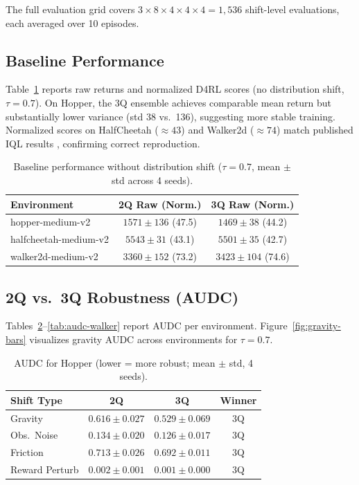 \documentclass[conference]{IEEEtran}
\begin{document}
The full evaluation grid covers $3 \times 8 \times 4 \times 4 \times 4 =
1{,}536$ shift-level evaluations, each averaged over 10 episodes.

\subsection{Baseline Performance}

Table~\ref{tab:baseline} reports raw returns and normalized D4RL scores (no
distribution shift, $\tau = 0.7$). On Hopper, the 3Q ensemble achieves
comparable mean return but substantially lower variance (std 38 vs.\ 136),
suggesting more stable training. Normalized scores on HalfCheetah
(${\approx}43$) and Walker2d (${\approx}74$) match published IQL results
\cite{kostrikov2022iql}, confirming correct reproduction.

\begin{table}[t]
  \centering
  \caption{Baseline performance without distribution shift ($\tau = 0.7$,
           mean $\pm$ std across 4 seeds).}
  \label{tab:baseline}
  \begin{tabular}{lcc}
    \toprule
    Environment & 2Q Raw (Norm.) & 3Q Raw (Norm.) \\
    \midrule
    hopper-medium-v2      & $1571\pm136$ (47.5) & $1469\pm38$ (44.2) \\
    halfcheetah-medium-v2 & $5543\pm31$  (43.1) & $5501\pm35$ (42.7) \\
    walker2d-medium-v2    & $3360\pm152$ (73.2) & $3423\pm104$ (74.6) \\
    \bottomrule
  \end{tabular}
\end{table}

\subsection{2Q vs.\ 3Q Robustness (AUDC)}

Tables~\ref{tab:audc-hopper}--\ref{tab:audc-walker} report AUDC per
environment. Figure~\ref{fig:gravity-bars} visualizes gravity AUDC across
environments for $\tau = 0.7$.

\begin{table}[t]
  \centering
  \caption{AUDC for Hopper (lower = more robust; mean $\pm$ std, 4 seeds).}
  \label{tab:audc-hopper}
  \begin{tabular}{lccc}
    \toprule
    Shift Type     & 2Q              & 3Q              & Winner \\
    \midrule
    Gravity        & $0.616\pm0.027$ & $0.529\pm0.069$ & 3Q \\
    Obs.\ Noise    & $0.134\pm0.020$ & $0.126\pm0.017$ & 3Q \\
    Friction       & $0.713\pm0.026$ & $0.692\pm0.011$ & 3Q \\
    Reward Perturb & $0.002\pm0.001$ & $0.001\pm0.000$ & 3Q \\
    \bottomrule
  \end{tabular}
\end{table}
\end{document}
